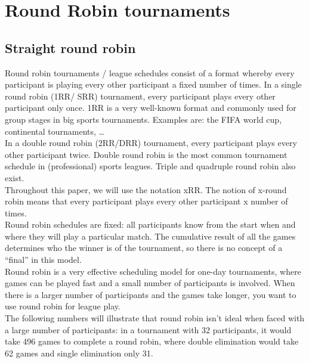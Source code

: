 \section{Round Robin tournaments}
\subsection{Straight round robin}
Round robin tournaments / league schedules consist of a format whereby every participant is playing every other participant a fixed number of times. In a single round robin (1RR/ SRR) tournament, every participant plays every other participant only once. 1RR is a very well-known format and commonly used for group stages in big sports tournaments. Examples are: the FIFA world cup, continental tournaments, …
\\[5px]
In a double round robin (2RR/DRR) tournament, every participant plays every other participant twice. Double round robin is the most common tournament schedule in (professional) sports leagues. Triple and quadruple round robin also exist.
\\[5px] 
Throughout this paper, we will use the notation xRR. The notion of x-round robin means that every participant plays every other participant x number of times.
\\[5px]
Round robin schedules are fixed: all participants know from the start when and where they will play a particular match. The cumulative result of all the games determines who the winner is of the tournament, so there is no concept of a “final” in this model.
\\[5px]
Round robin is a very effective scheduling model for one-day tournaments, where games can be played fast and a small number of participants is involved. When there is a larger number of participants and the games take longer, you want to use round robin for league play.
\\[5px]
The following numbers will illustrate that round robin isn’t ideal when faced with a large number of participants: in a tournament with 32 participants, it would take 496 games to complete a round robin, where double elimination would take 62 games and single elimination only 31.    

